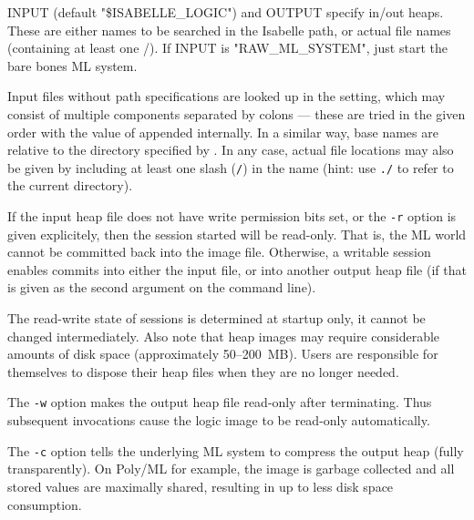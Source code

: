 \begin{isabellebody}
\begin{isamarkuptext}
\begin{ttbox}
  INPUT (default "\$ISABELLE_LOGIC") and OUTPUT specify in/out heaps.
  These are either names to be searched in the Isabelle path, or
  actual file names (containing at least one /).
  If INPUT is "RAW_ML_SYSTEM", just start the bare bones ML system.
\end{ttbox}

  Input files without path specifications are looked up in the
  \hyperlink{setting.ISABELLE-PATH}{\mbox{}} setting, which may consist of multiple
  components separated by colons --- these are tried in the given
  order with the value of \hyperlink{setting.ML-IDENTIFIER}{\mbox{}} appended
  internally.  In a similar way, base names are relative to the
  directory specified by \hyperlink{setting.ISABELLE-OUTPUT}{\mbox{}}.  In any case,
  actual file locations may also be given by including at least one
  slash (\verb|/|) in the name (hint: use \verb|./| to
  refer to the current directory).%
\end{isamarkuptext}%
\isamarkuptrue%
%
\isamarkuptrue%
%
\begin{isamarkuptext}%
If the input heap file does not have write permission bits set, or
  the \verb|-r| option is given explicitely, then the session
  started will be read-only.  That is, the ML world cannot be
  committed back into the image file.  Otherwise, a writable session
  enables commits into either the input file, or into another output
  heap file (if that is given as the second argument on the command
  line).

  The read-write state of sessions is determined at startup only, it
  cannot be changed intermediately. Also note that heap images may
  require considerable amounts of disk space (approximately
  50--200~MB). Users are responsible for themselves to dispose their
  heap files when they are no longer needed.

  \medskip The \verb|-w| option makes the output heap file
  read-only after terminating.  Thus subsequent invocations cause the
  logic image to be read-only automatically.

  \medskip The \verb|-c| option tells the underlying ML system
  to compress the output heap (fully transparently).  On Poly/ML for
  example, the image is garbage collected and all stored values are
  maximally shared, resulting in up to  less disk space
  consumption.


\end{isamarkuptext}
\end{isabellebody}
